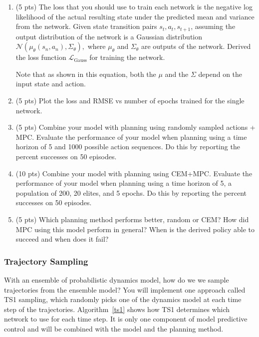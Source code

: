 \documentclass[12pt]{article}
\begin{document}
\begin{enumerate}
    \item (5 pts) The loss that you should use to train each network is the negative log likelihood of the actual resulting state under the predicted mean and variance from the network. Given state transition pairs $s_t, a_t, s_{t+1}$, assuming the output distribution of the network is a Gaussian distribution $\mathcal{N}(\mu_\theta(s_n,a_n), \Sigma_\theta),$ where $\mu_\theta$ and $\Sigma_\theta$ are outputs of the network. Derived the loss function $\mathcal{L}_{\text{Gauss}}$ for training the network.
    \begin{solution}
    \end{solution}
    
Note that as shown in this equation, both the $\mu$ and the $\Sigma$ depend on the input state and action.  
    \item (5 pts) Plot the loss and RMSE vs number of epochs trained for the single network.
    \begin{solution}
    \end{solution}
    \item (5 pts) Combine your model with planning using randomly sampled actions + MPC.  Evaluate the performance of your model when planning using a time horizon of 5 and 1000 possible action sequences.  Do this by reporting the percent successes on 50 episodes.
    \begin{solution}
    \end{solution}
    \item (10 pts) Combine your model with planning using CEM+MPC.  Evaluate the performance of your model when planning using a time horizon of 5, a population of 200, 20 elites, and 5 epochs.  Do this by reporting the percent successes on 50 episodes.
    \begin{solution}
    \end{solution}
    \item (5 pts) Which planning method performs better, random or CEM?  How did MPC using this model perform in general?  When is the derived policy able to succeed and when does it fail?
    \begin{solution}
    \end{solution}
\end{enumerate}


\subsubsection*{Trajectory Sampling}
With an ensemble of probabilistic dynamics model, how do we we sample trajectories from the ensemble model? You will implement one approach called TS1 sampling, which randomly picks one of the dynamics model at each time step of the trajectories. Algorithm~\ref{ts1} shows how TS1 determines which network to use for each time step. It is only one component of model predictive control and will be combined with the model and the planning method.
\end{document}
